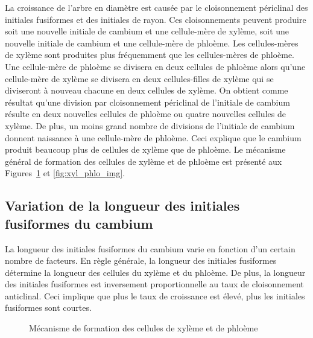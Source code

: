 La croissance de l'arbre en diamètre est causée par le cloisonnement périclinal des initiales fusiformes et des initiales de rayon. Ces cloisonnements peuvent produire soit une nouvelle initiale de cambium et une cellule-mère de xylème, soit une nouvelle initiale de cambium et une cellule-mère de phloème. Les cellules-mères de xylème sont produites plus fréquemment que les cellules-mères de phloème. Une cellule-mère de phloème se divisera en deux cellules de phloème alors qu'une cellule-mère de xylème se divisera en deux cellules-filles de xylème qui se diviseront à nouveau chacune en deux cellules de xylème. On obtient comme résultat qu'une division par cloisonnement périclinal de l'initiale de cambium résulte en deux nouvelles cellules de phloème ou quatre nouvelles cellules de xylème.  De plus, un moins grand nombre de divisions de l'initiale de cambium donnent naissance à une cellule-mère de phloème. Ceci explique que le cambium produit beaucoup plus de cellules de xylème que de phloème. Le mécanisme général de formation des cellules de xylème et de phloème est présenté aux Figures~\ref{fig:xyl_phlo} et \ref{fig:xyl_phlo_img}.

\subsection{Variation de la longueur des initiales fusiformes du cambium}

La longueur des initiales fusiformes du cambium varie en fonction d'un certain nombre de facteurs. En règle générale, la longueur des initiales fusiformes détermine la longueur des cellules du xylème et du phloème.  De plus, la longueur des initiales fusiformes est inversement proportionnelle au taux de cloisonnement anticlinal. Ceci implique que plus le taux de croissance est élevé, plus les initiales fusiformes sont courtes.

\begin{figure}[h]
\centering

\caption{Mécanisme de formation des cellules de xylème et de phloème}
\label{fig:xyl_phlo}	
\end{figure}


